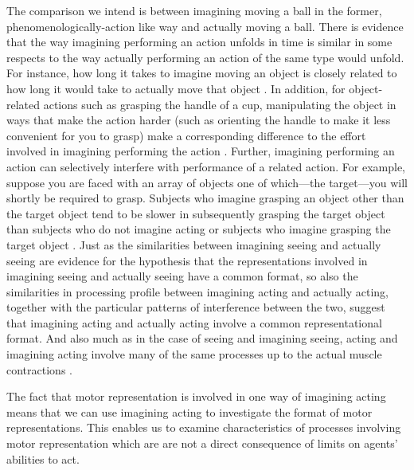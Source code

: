 \documentclass[12pt,\papersize]{extarticle}
\begin{document}
The comparison we intend is between imagining moving a ball in the former, phenomenologically-action like way and actually moving a ball. There is evidence that the way imagining performing an action unfolds in time is similar in some respects to the way actually performing an action of the same type would unfold.  For instance, how long it takes to imagine moving an object is closely related to how long it would take to actually move that object \citep{decety:1989_timing, decety:1996_imagined, Jeannerod:1994oz}. In addition, for object-related actions such as grasping the handle of a cup, manipulating the object in ways that make the action harder (such as orienting the handle to make it less convenient for you to grasp) make a corresponding difference to the effort involved in imagining performing the action \citep{parsons:1994_temporal, frak:2001_orientation}. Further, imagining performing an action can selectively interfere with performance of a related action. For example, suppose you are faced with an array of objects one of which---the target---you will shortly be required to grasp.  Subjects who imagine grasping an object other than the target object tend to be slower in subsequently grasping the target object than subjects who do not imagine acting or subjects who imagine grasping the target object \citep{ramsey:2010_incongruent_}. Just as the similarities between imagining seeing and actually seeing are evidence for the hypothesis that the representations involved in imagining seeing and actually seeing have a common format, so also the similarities in processing profile between imagining acting and actually acting, together with the particular patterns of interference between the two, suggest that imagining acting and actually acting involve a common representational format. And also much as in the case of seeing and imagining seeing, acting and imagining acting involve many of the same processes up to the actual muscle contractions \citep{jeannerod:1995_mental, jeannerod:2003_mechanism}. 

The fact that motor representation is involved in one way of imagining acting means that we can use imagining acting to investigate the format of motor representations. This enables us to examine characteristics of processes involving motor representation which are are not a direct consequence of limits on agents' abilities to act.
\end{document}
